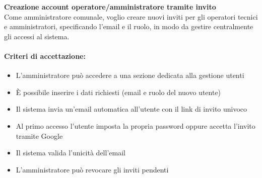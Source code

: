 \textbf{Creazione account operatore/amministratore tramite invito} \\
Come amministratore comunale, voglio creare nuovi inviti per gli operatori tecnici e amministratori, specificando l'email e il ruolo, in modo da gestire centralmente gli accessi al sistema.

\paragraph*{Criteri di accettazione:}
\begin{itemize}
    \item L'amministratore può accedere a una sezione dedicata alla gestione utenti
    \item È possibile inserire i dati richiesti (email e ruolo del nuovo utente)
    \item Il sistema invia un'email automatica all'utente con il link di invito univoco
    \item Al primo accesso l'utente imposta la propria password oppure accetta l'invito tramite Google
    \item Il sistema valida l'unicità dell'email
    \item L'amministratore può revocare gli inviti pendenti
\end{itemize}

